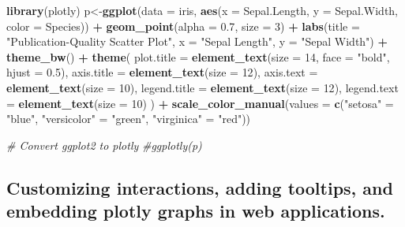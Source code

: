 \documentclass[
]{book}
\newenvironment{Shaded}{\begin{snugshade}}{\end{snugshade}}
\newcommand{\AttributeTok}[1]{\textcolor[rgb]{0.13,0.29,0.53}{#1}}
\newcommand{\CommentTok}[1]{\textcolor[rgb]{0.56,0.35,0.01}{\textit{#1}}}
\newcommand{\DecValTok}[1]{\textcolor[rgb]{0.00,0.00,0.81}{#1}}
\newcommand{\FloatTok}[1]{\textcolor[rgb]{0.00,0.00,0.81}{#1}}
\newcommand{\FunctionTok}[1]{\textcolor[rgb]{0.13,0.29,0.53}{\textbf{#1}}}
\newcommand{\NormalTok}[1]{#1}
\newcommand{\OtherTok}[1]{\textcolor[rgb]{0.56,0.35,0.01}{#1}}
\newcommand{\SpecialCharTok}[1]{\textcolor[rgb]{0.81,0.36,0.00}{\textbf{#1}}}
\newcommand{\StringTok}[1]{\textcolor[rgb]{0.31,0.60,0.02}{#1}}
\begin{document}
\begin{Shaded}
\begin{Highlighting}[]
\FunctionTok{library}\NormalTok{(plotly)}
\NormalTok{p}\OtherTok{\textless{}{-}}\FunctionTok{ggplot}\NormalTok{(}\AttributeTok{data =}\NormalTok{ iris, }\FunctionTok{aes}\NormalTok{(}\AttributeTok{x =}\NormalTok{ Sepal.Length, }\AttributeTok{y =}\NormalTok{ Sepal.Width, }\AttributeTok{color =}\NormalTok{ Species)) }\SpecialCharTok{+} 
  \FunctionTok{geom\_point}\NormalTok{(}\AttributeTok{alpha =} \FloatTok{0.7}\NormalTok{, }\AttributeTok{size =} \DecValTok{3}\NormalTok{) }\SpecialCharTok{+}
  \FunctionTok{labs}\NormalTok{(}\AttributeTok{title =} \StringTok{"Publication{-}Quality Scatter Plot"}\NormalTok{,}
       \AttributeTok{x =} \StringTok{"Sepal Length"}\NormalTok{, }\AttributeTok{y =} \StringTok{"Sepal Width"}\NormalTok{) }\SpecialCharTok{+}
  \FunctionTok{theme\_bw}\NormalTok{() }\SpecialCharTok{+}
  \FunctionTok{theme}\NormalTok{(}
    \AttributeTok{plot.title =} \FunctionTok{element\_text}\NormalTok{(}\AttributeTok{size =} \DecValTok{14}\NormalTok{, }\AttributeTok{face =} \StringTok{"bold"}\NormalTok{, }\AttributeTok{hjust =} \FloatTok{0.5}\NormalTok{),}
    \AttributeTok{axis.title =} \FunctionTok{element\_text}\NormalTok{(}\AttributeTok{size =} \DecValTok{12}\NormalTok{),}
    \AttributeTok{axis.text =} \FunctionTok{element\_text}\NormalTok{(}\AttributeTok{size =} \DecValTok{10}\NormalTok{),}
    \AttributeTok{legend.title =} \FunctionTok{element\_text}\NormalTok{(}\AttributeTok{size =} \DecValTok{12}\NormalTok{),}
    \AttributeTok{legend.text =} \FunctionTok{element\_text}\NormalTok{(}\AttributeTok{size =} \DecValTok{10}\NormalTok{)}
\NormalTok{  ) }\SpecialCharTok{+}
  \FunctionTok{scale\_color\_manual}\NormalTok{(}\AttributeTok{values =} \FunctionTok{c}\NormalTok{(}\StringTok{"setosa"} \OtherTok{=} \StringTok{"blue"}\NormalTok{, }\StringTok{"versicolor"} \OtherTok{=} \StringTok{"green"}\NormalTok{, }\StringTok{"virginica"} \OtherTok{=} \StringTok{"red"}\NormalTok{))}

\CommentTok{\# Convert ggplot2 to plotly}
\CommentTok{\#ggplotly(p)}
\end{Highlighting}
\end{Shaded}

\subsection{Customizing interactions, adding tooltips, and embedding plotly graphs in web applications.}\label{customizing-interactions-adding-tooltips-and-embedding-plotly-graphs-in-web-applications.}
\end{document}
